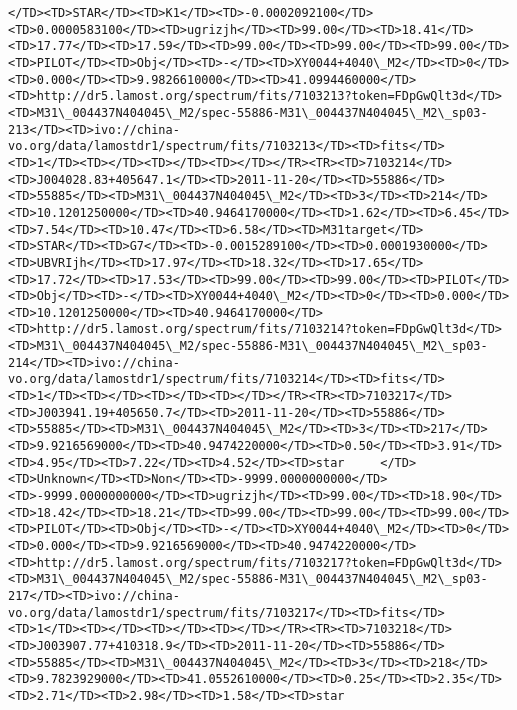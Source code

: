 \documentclass[11pt]{article}
\begin{document}
\begin{Verbatim}[commandchars=\\\{\}]
</TD><TD>STAR</TD><TD>K1</TD><TD>-0.0002092100</TD><TD>0.0000583100</TD><TD>ugrizjh</TD><TD>99.00</TD><TD>18.41</TD><TD>17.77</TD><TD>17.59</TD><TD>99.00</TD><TD>99.00</TD><TD>99.00</TD><TD>PILOT</TD><TD>Obj</TD><TD>-</TD><TD>XY0044+4040\_M2</TD><TD>0</TD><TD>0.000</TD><TD>9.9826610000</TD><TD>41.0994460000</TD><TD>http://dr5.lamost.org/spectrum/fits/7103213?token=FDpGwQlt3d</TD><TD>M31\_004437N404045\_M2/spec-55886-M31\_004437N404045\_M2\_sp03-213</TD><TD>ivo://china-vo.org/data/lamostdr1/spectrum/fits/7103213</TD><TD>fits</TD><TD>1</TD><TD></TD><TD></TD><TD></TD></TR><TR><TD>7103214</TD><TD>J004028.83+405647.1</TD><TD>2011-11-20</TD><TD>55886</TD><TD>55885</TD><TD>M31\_004437N404045\_M2</TD><TD>3</TD><TD>214</TD><TD>10.1201250000</TD><TD>40.9464170000</TD><TD>1.62</TD><TD>6.45</TD><TD>7.54</TD><TD>10.47</TD><TD>6.58</TD><TD>M31target</TD><TD>STAR</TD><TD>G7</TD><TD>-0.0015289100</TD><TD>0.0001930000</TD><TD>UBVRIjh</TD><TD>17.97</TD><TD>18.32</TD><TD>17.65</TD><TD>17.72</TD><TD>17.53</TD><TD>99.00</TD><TD>99.00</TD><TD>PILOT</TD><TD>Obj</TD><TD>-</TD><TD>XY0044+4040\_M2</TD><TD>0</TD><TD>0.000</TD><TD>10.1201250000</TD><TD>40.9464170000</TD><TD>http://dr5.lamost.org/spectrum/fits/7103214?token=FDpGwQlt3d</TD><TD>M31\_004437N404045\_M2/spec-55886-M31\_004437N404045\_M2\_sp03-214</TD><TD>ivo://china-vo.org/data/lamostdr1/spectrum/fits/7103214</TD><TD>fits</TD><TD>1</TD><TD></TD><TD></TD><TD></TD></TR><TR><TD>7103217</TD><TD>J003941.19+405650.7</TD><TD>2011-11-20</TD><TD>55886</TD><TD>55885</TD><TD>M31\_004437N404045\_M2</TD><TD>3</TD><TD>217</TD><TD>9.9216569000</TD><TD>40.9474220000</TD><TD>0.50</TD><TD>3.91</TD><TD>4.95</TD><TD>7.22</TD><TD>4.52</TD><TD>star     </TD><TD>Unknown</TD><TD>Non</TD><TD>-9999.0000000000</TD><TD>-9999.0000000000</TD><TD>ugrizjh</TD><TD>99.00</TD><TD>18.90</TD><TD>18.42</TD><TD>18.21</TD><TD>99.00</TD><TD>99.00</TD><TD>99.00</TD><TD>PILOT</TD><TD>Obj</TD><TD>-</TD><TD>XY0044+4040\_M2</TD><TD>0</TD><TD>0.000</TD><TD>9.9216569000</TD><TD>40.9474220000</TD><TD>http://dr5.lamost.org/spectrum/fits/7103217?token=FDpGwQlt3d</TD><TD>M31\_004437N404045\_M2/spec-55886-M31\_004437N404045\_M2\_sp03-217</TD><TD>ivo://china-vo.org/data/lamostdr1/spectrum/fits/7103217</TD><TD>fits</TD><TD>1</TD><TD></TD><TD></TD><TD></TD></TR><TR><TD>7103218</TD><TD>J003907.77+410318.9</TD><TD>2011-11-20</TD><TD>55886</TD><TD>55885</TD><TD>M31\_004437N404045\_M2</TD><TD>3</TD><TD>218</TD><TD>9.7823929000</TD><TD>41.0552610000</TD><TD>0.25</TD><TD>2.35</TD><TD>2.71</TD><TD>2.98</TD><TD>1.58</TD><TD>star     
\end{Verbatim}
\end{document}
